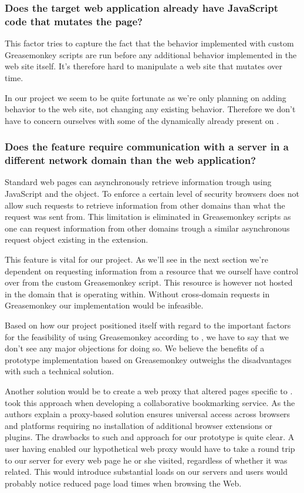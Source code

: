 \subsubsection{Does the target web application already have JavaScript code
  that mutates the page?}

This factor tries to capture the fact that the behavior implemented with
custom Greasemonkey scripts are run before any additional behavior
implemented in the web site itself. It's therefore hard to manipulate
a web site that mutates over time.

In our project we seem to be quite fortunate as we're only planning on adding
behavior to the \urort{} web site, not changing any existing behavior.
Therefore we don't have to concern ourselves with some of the dynamically
already present on \urort{}.

\subsubsection{Does the feature require communication with a server in a
  different network domain than the web application?}
\label{section:implementation.architecture,extending.different.domain}

Standard web pages can asynchronously retrieve information trough using
JavaScript and the  object. To enforce a certain
level of security browsers does not allow such requests to retrieve
information from other domains than what the request was sent from.
This limitation is eliminated in Greasemonkey scripts as one can request
information from other domains trough a similar asynchronous request object
existing in the extension.

This feature is vital for our project. As we'll see in the next section we're
dependent on requesting information from a resource that we ourself have
control over from the custom Greasemonkey script. This resource is however
not hosted in the domain that \urort{} is operating within. Without
cross-domain requests in Greasemonkey our implementation would be infeasible.

Based on how our project positioned itself with regard to the important
factors for the feasibility of using Greasemonkey
according to \citet{laird07}, we have to say that we
don't see any major objections for doing so.
We believe the benefits of a prototype implementation
based on Greasemonkey outweighs the disadvantages with such a technical
solution.

Another solution would be to create a web proxy that altered pages specific to
\urort{}. \citet[]{keller97} took this approach when developing
a collaborative bookmarking service. As the authors explain a proxy-based
solution ensures universal access across browsers and platforms requiring no
installation of additional browser extensions or plugins. The drawbacks to
such and approach for our prototype is quite clear. A user having enabled
our hypothetical web proxy would have to take a round trip to our server for
every web page he or she visited, regardless of whether it was \urort{}
related. This would introduce substantial loads on our servers and users would
probably notice reduced page load times when browsing the Web.

